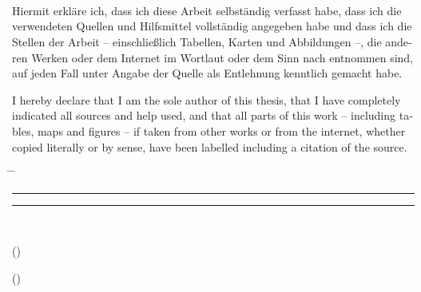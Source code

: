 \chapter*{\declarationlabel}

\tuinfthesisauthor\\
\tuinfthesisauthoraddress

\vspace*{1.2cm}

\begin{otherlanguage}{ngerman}
  Hiermit erkl\"are ich, dass ich diese Arbeit selbst\"andig verfasst habe, dass ich die verwendeten Quellen und Hilfsmittel vollst\"andig angegeben habe und dass ich die Stellen der Arbeit -- einschlie\ss{}lich Tabellen, Karten und Abbildungen --, die anderen Werken oder dem Internet im Wortlaut oder dem Sinn nach entnommen sind, auf jeden Fall unter Angabe der Quelle als Entlehnung kenntlich gemacht habe.\\
\end{otherlanguage}

\vspace*{1cm}

\begin{otherlanguage}{english}
  I hereby declare that I am the sole author of this thesis, that I have completely indicated all sources and help used, and that all parts of this work -- including tables, maps and figures -- if taken from other works or from the internet, whether copied literally or by sense, have been labelled including a citation of the source.
\end{otherlanguage}

\vspace*{2cm}
\begin{tabbing}%
    \hspace{58mm} \= \hspace{28mm} \= \hspace{58mm} \kill
    {\raggedright\rule{58mm}{0.5pt}} \> \> {\raggedright\rule{58mm}{0.5pt}} \\
    \begin{minipage}[t][0.5cm][t]{58mm}
	\vspace{0pt}\sffamily\thesistitlefontnormalsize
	\centering ()
    \end{minipage}
    \> \>
    \begin{minipage}[t][0.5cm][t]{58mm}
	\vspace{0pt}\sffamily\thesistitlefontnormalsize
	\centering ()
    \end{minipage}
\end{tabbing}